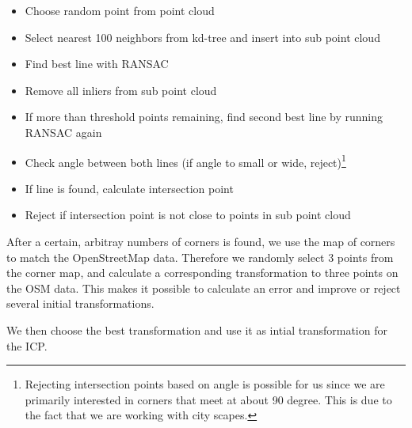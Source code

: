 \documentclass[10pt,twocolumn,letterpaper]{article}
\begin{document}
\begin{itemize}
    \item Choose random point from point cloud
    \item Select nearest 100 neighbors from kd-tree and insert into sub point cloud
    \item Find best line with RANSAC
    \item Remove all inliers from sub point cloud
    \item If more than threshold points remaining, find second best line by running RANSAC again
    \item Check angle between both lines (if angle to small or wide, reject)\footnote{Rejecting intersection points based on angle is possible for us since we are primarily interested in corners that meet at about 90 degree. This is due to the fact that we are working with city scapes.}
    \item If line is found, calculate intersection point
    \item Reject if intersection point is not close to points in sub point cloud
\end{itemize} 

After a certain, arbitray numbers of corners is found, we use the map of corners to match the OpenStreetMap data. Therefore we randomly select 3 points from the corner map, and calculate a corresponding transformation to three points on the OSM data. This makes it possible to calculate an error and improve or reject several initial transformations.

We then choose the best transformation and use it as intial transformation for the ICP.

{\small


}
\end{document}
